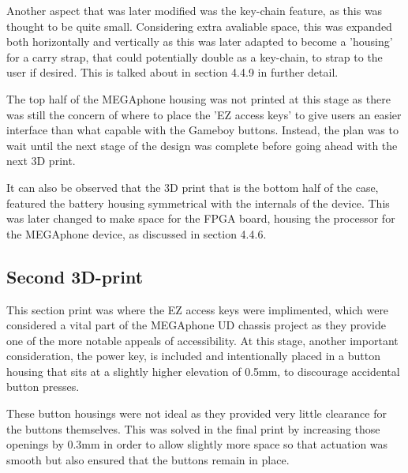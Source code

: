 Another aspect that was later modified was the key-chain feature, as this was thought to be quite small.
Considering extra avaliable space, this was expanded both horizontally and vertically as this was later adapted to become a 'housing' for a carry strap, that could potentially double as a key-chain, to strap to the user if desired.
This is talked about in section 4.4.9 in further detail.

The top half of the MEGAphone housing was not printed at this stage as there was still the concern of where to place the 'EZ access keys' to give users an easier interface than what capable with the Gameboy buttons.
Instead, the plan was to wait until the next stage of the design was complete before going ahead with the next 3D print.

It can also be observed that the 3D print that is the bottom half of the case, featured the battery housing symmetrical with the internals of the device.
This was later changed to make space for the FPGA board, housing the processor for the MEGAphone device, as discussed in section 4.4.6.

\subsection{Second 3D-print}

This section print was where the EZ access keys were implimented, which were considered a vital part of the MEGAphone UD chassis project as they provide one of the more notable appeals of accessibility.
At this stage, another important consideration, the power key, is included and intentionally placed in a button housing that sits at a slightly higher elevation of 0.5mm, to discourage accidental button presses.

These button housings were not ideal as they provided very little clearance for the buttons themselves.
This was solved in the final print by increasing those openings by 0.3mm in order to allow slightly more space so that actuation was smooth but also ensured that the buttons remain in place.

